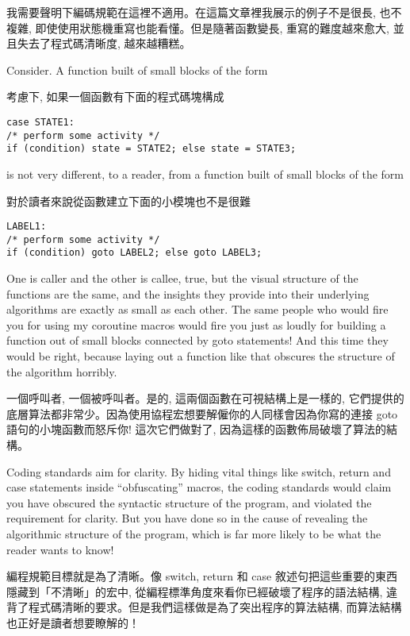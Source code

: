 \documentclass[12pt]{article}
\begin{document}
\begin{CJK}{UTF8}{bsmi}
我需要聲明下編碼規範在這裡不適用。在這篇文章裡我展示的例子不是很長, 也不複雜, 即使使用狀態機重寫也能看懂。但是隨著函數變長, 重寫的難度越來愈大, 並且失去了程式碼清晰度, 越來越糟糕。 

Consider. A function built of small blocks of the form

考慮下, 如果一個函數有下面的程式碼塊構成 

\begin{lstlisting}[basicstyle=\footnotesize, breaklines=true]
case STATE1:
/* perform some activity */
if (condition) state = STATE2; else state = STATE3;
\end{lstlisting}

is not very different, to a reader, from a function built of small blocks of the form

 對於讀者來說從函數建立下面的小模塊也不是很難 

\begin{lstlisting}[basicstyle=\footnotesize, breaklines=true]
LABEL1:
/* perform some activity */
if (condition) goto LABEL2; else goto LABEL3;
\end{lstlisting}

One is caller and the other is callee, true, but the visual structure of the functions are the same, and the insights they provide into their underlying algorithms are exactly as small as each other. The same people who would fire you for using my coroutine macros would fire you just as loudly for building a function out of small blocks connected by goto statements! And this time they would be right, because laying out a function like that obscures the structure of the algorithm horribly.

 一個呼叫者, 一個被呼叫者。是的, 這兩個函數在可視結構上是一樣的, 它們提供的底層算法都非常少。因為使用協程宏想要解僱你的人同樣會因為你寫的連接 goto 語句的小塊函數而怒斥你! 這次它們做對了, 因為這樣的函數佈局破壞了算法的結構。 

Coding standards aim for clarity. By hiding vital things like switch, return and case statements inside ``obfuscating'' macros, the coding standards would claim you have obscured the syntactic structure of the program, and violated the requirement for clarity. But you have done so in the cause of revealing the algorithmic structure of the program, which is far more likely to be what the reader wants to know!

編程規範目標就是為了清晰。像 switch, return 和 case 敘述句把這些重要的東西隱藏到「不清晰」的宏中, 從編程標準角度來看你已經破壞了程序的語法結構, 違背了程式碼清晰的要求。但是我們這樣做是為了突出程序的算法結構, 而算法結構也正好是讀者想要瞭解的！


\end{CJK}
\end{document}
